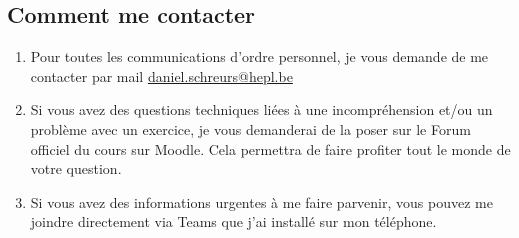 \subsection{Comment me contacter}
\begin{enumerate}
    \item Pour toutes les communications d'ordre personnel, je vous demande de me contacter par mail \href{mailto:daniel.schreurs@hepl.be}{daniel.schreurs@hepl.be}
    \item Si vous avez des questions techniques liées à une incompréhension et/ou un problème avec un exercice, je vous demanderai de la poser sur le Forum officiel du cours sur Moodle. Cela permettra de faire profiter tout le monde de votre question.
    \item Si vous avez des informations urgentes à me faire parvenir, vous pouvez me joindre directement via Teams que j'ai installé sur mon téléphone.
\end{enumerate}


\clearpage
\printbibliography


